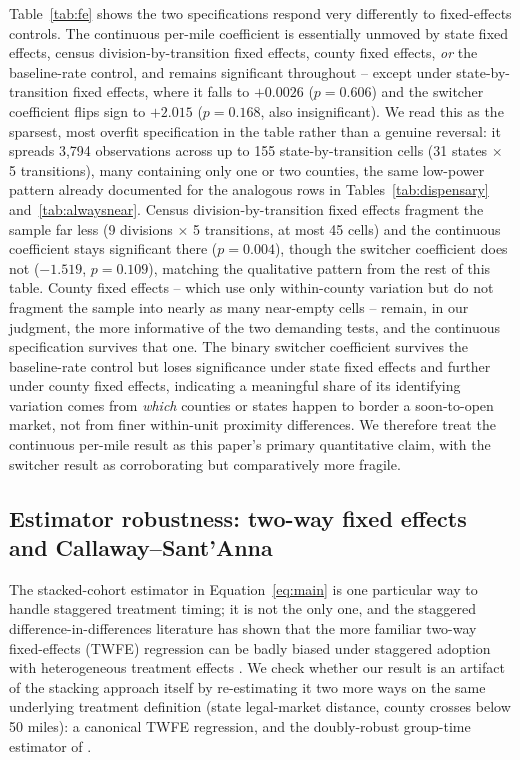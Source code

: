 \documentclass[preprint,12pt,authoryear]{elsarticle}
\begin{document}
Table~\ref{tab:fe} shows the two specifications respond very
differently to fixed-effects controls. The continuous per-mile
coefficient is essentially unmoved by state fixed effects, census
division-by-transition fixed effects, county fixed effects, \emph{or}
the baseline-rate control, and remains significant throughout --
except under state-by-transition fixed effects, where it falls to
$+0.0026$ ($p=0.606$) and the switcher coefficient flips sign to
$+2.015$ ($p=0.168$, also insignificant). We read this as the sparsest,
most overfit specification in the table rather than a genuine
reversal: it spreads 3,794 observations across up to 155
state-by-transition cells (31 states $\times$ 5 transitions), many
containing only one or two counties, the same low-power pattern
already documented for the analogous rows in
Tables~\ref{tab:dispensary} and~\ref{tab:alwaysnear}. Census
division-by-transition fixed effects fragment the sample far less (9
divisions $\times$ 5 transitions, at most 45 cells) and the continuous
coefficient stays significant there ($p=0.004$), though the switcher
coefficient does not ($-1.519$, $p=0.109$), matching the qualitative
pattern from the rest of this table. County fixed
effects -- which use only within-county variation but do not fragment
the sample into nearly as many near-empty cells -- remain, in our
judgment, the more informative of the two demanding tests, and the
continuous specification survives that one. The binary switcher
coefficient survives the baseline-rate control but loses significance
under state fixed effects and further under county fixed effects,
indicating a meaningful share of its identifying variation comes from
\emph{which} counties or states happen to border a soon-to-open
market, not from finer within-unit proximity differences. We therefore
treat the continuous per-mile result as this paper's primary
quantitative claim, with the switcher result as corroborating but
comparatively more fragile.

\subsection{Estimator robustness: two-way fixed effects and Callaway--Sant'Anna}
\label{sec:twfecs}

The stacked-cohort estimator in Equation~\ref{eq:main} is one
particular way to handle staggered treatment timing; it is not the
only one, and the staggered difference-in-differences literature has
shown that the more familiar two-way fixed-effects (TWFE) regression
can be badly biased under staggered adoption with heterogeneous
treatment effects \citep{GoodmanBacon2021}. We check whether our
result is an artifact of the stacking approach itself by re-estimating
it two more ways on the same underlying treatment definition (state
legal-market distance, county crosses below 50 miles): a canonical
TWFE regression, and the doubly-robust group-time estimator of
\citet{CallawaySantAnna2021}.
\end{document}
